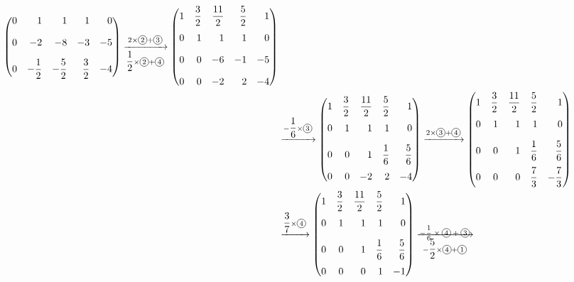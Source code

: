 \begin{align*}
\begin{pmatrix*}[r]
            0 &  1 &   1 &  1 & 0 \\[1em]
            0 & -2 &  -8 & -3 & -5 \\[1em]
            0 & -\dfrac{1}{2} & -\dfrac{5}{2} & \dfrac{3}{2} & -4
        \end{pmatrix*}
        \xrightarrow[\dfrac{1}{2} \times \tc{2} + \tc{4}]{2 \times \tc{2} + \tc{3}}
        \begin{pmatrix*}[r]
            1 & \dfrac{3}{2} & \dfrac{11}{2} & \dfrac{5}{2} & 1 \\[1em]
            0 &  1 &   1 &  1 & 0 \\[1em]
            0 &  0 &  -6 & -1 & -5 \\[1em]
            0 &  0 &  -2 &  2 & -4
        \end{pmatrix*} \\
    & \xrightarrow{-\dfrac{1}{6} \times \tc{3}}
        \begin{pmatrix*}[r]
            1 & \dfrac{3}{2} & \dfrac{11}{2} & \dfrac{5}{2} & 1 \\[1em]
            0 &  1 &   1 &  1 & 0 \\[1em]
            0 &  0 &   1 & \dfrac{1}{6} & \dfrac{5}{6} \\[1em]
            0 &  0 &  -2 &  2 & -4
        \end{pmatrix*}
        \xrightarrow{2 \times \tc{3} + \tc{4}}
        \begin{pmatrix*}[r]
            1 & \dfrac{3}{2} & \dfrac{11}{2} & \dfrac{5}{2} & 1 \\[1em]
            0 &  1 &   1 &  1 & 0 \\[1em]
            0 &  0 &   1 & \dfrac{1}{6} & \dfrac{5}{6} \\[1em]
            0 &  0 &   0 & \dfrac{7}{3} & -\dfrac{7}{3}
        \end{pmatrix*} \\
    & \xrightarrow{\dfrac{3}{7} \times \tc{4}}
        \begin{pmatrix*}[r]
            1 & \dfrac{3}{2} & \dfrac{11}{2} & \dfrac{5}{2} & 1 \\[1em]
            0 &  1 &   1 &  1 & 0 \\[1em]
            0 &  0 &   1 & \dfrac{1}{6} & \dfrac{5}{6} \\[1em]
            0 &  0 &   0 &  1 & -1
        \end{pmatrix*}
        \xrightarrow[-\dfrac{5}{2} \times \tc{4} + \tc{1}]{
            \scriptsize\begin{gathered}
                -\dfrac{1}{6} \times \tc{4} + \tc{3} \\[-1em]

\end{gathered}}
\end{align*}

